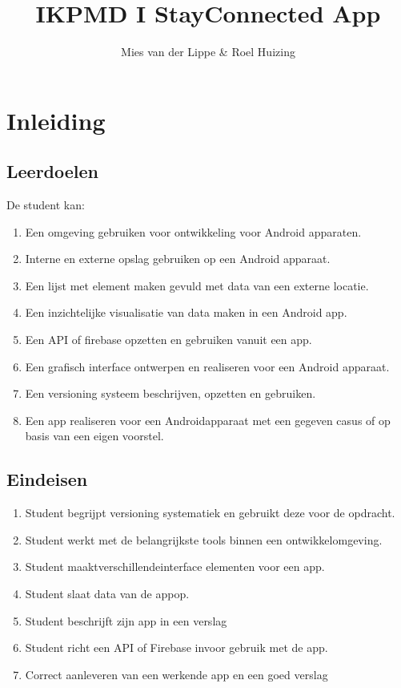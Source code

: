 \documentclass[dutch]{report}
\author{Mies van der Lippe \& Roel Huizing}
\title{IKPMD I StayConnected App}
\begin{document}
	
	
	\tableofcontents

	\newpage
	
	\section{Inleiding}
	
	\subsection{Leerdoelen}
	De student kan:
	\begin{enumerate}
		\item Een omgeving gebruiken voor ontwikkeling voor Android apparaten.
		\item Interne en externe opslag gebruiken op een Android apparaat.
		\item Een lijst met element maken gevuld met data van een externe locatie.
		\item Een inzichtelijke visualisatie van data maken in een Android app.
		\item Een API of firebase opzetten en gebruiken vanuit een app.
		\item Een grafisch interface ontwerpen en realiseren voor een Android apparaat.
		\item Een versioning systeem beschrijven, opzetten en gebruiken. 
		\item Een app realiseren voor een Androidapparaat met een gegeven casus of op basis van een eigen voorstel.
	\end{enumerate}

	\subsection{Eindeisen}
	\begin{enumerate}[label=\Alph*:]
		\item Student begrijpt versioning systematiek en gebruikt deze voor de opdracht.
		\item Student werkt met de belangrijkste tools binnen een ontwikkelomgeving.
		\item Student maaktverschillendeinterface elementen voor een app.
		\item Student slaat data van de appop.
		\item Student beschrijft zijn app in een verslag
		\item Student richt een API of Firebase invoor gebruik met de app.
		\item Correct aanleveren van een werkende app en een goed verslag
	\end{enumerate}
\end{document}
